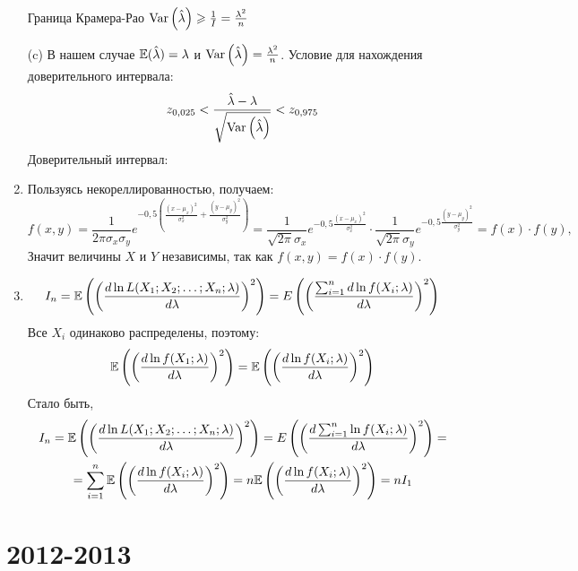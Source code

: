 \documentclass[12pt, a4paper]{article}\usepackage[]{graphicx}\usepackage[]{color}
\begin{document}
\begin{enumerate}
					Граница Крамера-Рао $\operatorname{Var}\left(\hat\lambda\right)\geqslant\frac{1}{I}=\frac{\lambda^2}{n}$


					(c) В нашем случае $\mathbb{E}(\hat\lambda)=\lambda$ и $\operatorname{Var}\left(\hat\lambda\right)=\frac{\lambda^2}{n}$.
					Условие для нахождения доверительного интервала:
					$$z_{0{,}025}<\frac{\hat\lambda-\lambda}{\sqrt{\operatorname{Var}\left(\hat{\lambda}\right)}}<z_{0{,}975}$$
					Доверительный интервал:





					\item Пользуясь некореллированностью, получаем:
					$$f(x,y)=\frac{1}{2\pi\sigma_x\sigma_y}e^{-0{,}5\left(\frac{(x-\mu_x)^2}{\sigma_x^2}+\frac{(y-\mu_y)^2}{\sigma_y^2}\right)}=
					\frac{1}{\sqrt{2\pi}\sigma_x}e^{-0{,}5\frac{(x-\mu_x)^2}{\sigma_x^2}}\cdot
					\frac{1}{\sqrt{2\pi}\sigma_y}e^{-0{,}5\frac{(y-\mu_y)^2}{\sigma_y^2}}=f(x)\cdot f(y),$$
					Значит величины $X$ и $Y$ независимы, так как $f(x,y)=f(x)\cdot f(y)$.

					\item
					$$
					I_n=\mathbb{E}\left(\left(\frac{d\ln L(X_1;X_2;\ldots;X_n;\lambda)}{d\lambda}\right)^2\right)=\\E\left(\left(\frac{\sum^n_{i=1}d\ln f(X_i;\lambda)}{d\lambda}\right)^2 \right)
					$$
					Все $X_i$ одинаково распределены, поэтому:
					$$\mathbb{E}\left(\left(\frac{d\ln f(X_1;\lambda)}{d\lambda}\right)^2\right)=\mathbb{E}\left(\left(\frac{d\ln f(X_i;\lambda)}{d\lambda}\right)^2\right)$$
					Стало быть,
					\begin{multline}
					I_n=\mathbb{E}\left(\left(\frac{d\ln L(X_1;X_2;\ldots;X_n;\lambda)}{d\lambda}\right)^2\right)=E\left(\left(\frac{d\sum^n_{i=1}\ln f(X_i;\lambda)}{d\lambda}\right)^2 \right)=\\
					=\sum^n_{i=1}\mathbb{E}\left(\left(\frac{d\ln f(X_i;\lambda)}{d\lambda}\right)^2 \right)=n\mathbb{E}\left(\left(\frac{d\ln f(X_i;\lambda)}{d\lambda}\right)^2 \right)=nI_1
					\end{multline}

				\end{enumerate}



				\section{2012-2013}
\end{document}
